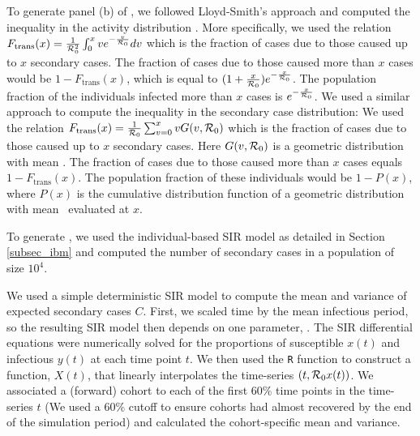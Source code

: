 To generate panel (b) of , we followed Lloyd-Smith's approach and computed the inequality in the activity distribution \cite[SI, Sec. 2.2.5]{lloydsmith2005superspreading}. 
More specifically, we used the relation $F_{\text{trans}}(x)=\frac{1}{{\mathcal R}_{\mathrm{0}}^2}\int_{0}^x ve^{-\frac{v}{{\mathcal R}_{\mathrm{0}}}}dv$ which is the fraction of cases
due to those caused up to $x$ secondary cases.
The fraction of cases due to those caused more than $x$ cases would be $1-F_{\text{trans}}(x)$, which is equal to $(1+\frac{x}{{\mathcal R}_{\mathrm{0}}})e^{-\frac{x}{{\mathcal R}_{\mathrm{0}}}}$.
The population fraction of the individuals infected more than $x$ cases is $e^{-\frac{x}{{\mathcal R}_{\mathrm{0}}}}$.
We used a similar approach to compute the  inequality in the secondary case distribution: We used the relation $F_{\mathrm{trans}}(x)=\frac{1}{{\mathcal R}_{\mathrm{0}}}\sum_{v=0}^x vG(v,{\mathcal R}_{\mathrm{0}})$ which is the fraction of cases
due to those caused up to $x$ secondary cases.
Here $G(v,{\mathcal R}_{\mathrm{0}})$ is a geometric distribution with mean \Ro.
The fraction of cases due to those caused more than $x$ cases equals $1-F_{\text{trans}}(x)$. 
The population fraction of these individuals would be $1 - P(x)$, where $P(x)$ is the cumulative distribution function of a geometric distribution with mean \Ro~evaluated at $x$.

To generate , we used the individual-based SIR model as detailed in Section
\ref{subsec_ibm} and computed the number of secondary cases in a population of size $10^4$. 


We used a simple deterministic SIR model to compute the mean and variance of expected secondary cases $C$.
First, we scaled time by the mean infectious period, so the resulting SIR model then depends on one parameter, \Ro. 
The SIR differential equations were numerically solved for the proportions of susceptible $x(t)$ and infectious $y(t)$ at each time point $t$. 
We then used the \texttt{R} function  to construct a function,  ${X}(t)$, that linearly interpolates the time-series $(t,{\mathcal R}_{\mathrm{0}} x(t))$.
We associated a (forward) cohort to each of the first $60\%$ time points in the time-series $t$ (We used a $60\%$ cutoff to ensure cohorts had almost recovered by the end of the simulation period) and calculated the cohort-specific mean  and variance.

